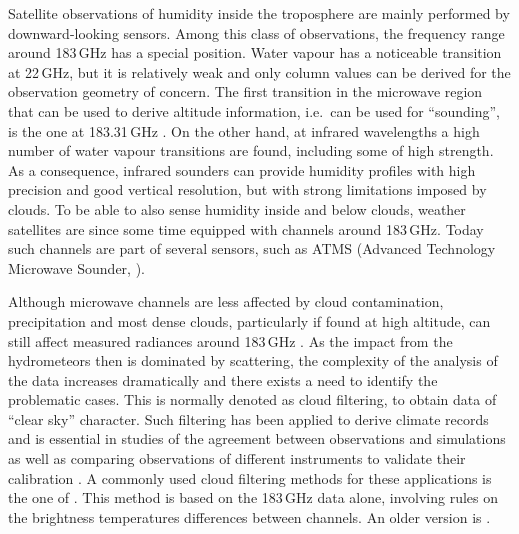 \documentclass[amt, manuscript]{copernicus}
\begin{document}
\introduction
%
Satellite observations of humidity inside the troposphere are mainly performed
by downward-looking sensors. Among this class of observations, the frequency
range around 183\,GHz has a special position. Water vapour has a noticeable
transition at 22\,GHz, but it is relatively weak and only column values can be
derived \citep[e.g.][]{schluessel1990atmospheric} for the observation geometry
of concern. The first transition in the microwave region that can be used to
derive altitude information, i.e.\ can be used for ``sounding'', is the one at
183.31\,GHz \citep{kakar1983retrieval,wang1983profiling}. On the other hand, at
infrared wavelengths a high number of water vapour transitions are found,
including some of high strength. As a consequence, infrared sounders can
provide humidity profiles with high precision and good vertical resolution, but
with strong limitations imposed by clouds. To be able to also sense humidity
inside and below clouds, weather satellites are since some time equipped with
channels around 183\,GHz. Today such channels are part of several sensors, such
as ATMS (Advanced Technology Microwave Sounder, \citet{weng2012introduction}).

Although microwave channels are less affected by cloud contamination, precipitation and most dense clouds, particularly if found at high altitude, can
still affect measured radiances around 183\,GHz
\citep[e.g.][]{bennartz2003sensitivity}. As the impact from the hydrometeors
then is dominated by scattering, the complexity of the analysis of the data
increases dramatically and there exists a need to identify the problematic
cases. This is normally denoted as cloud filtering, to obtain data of ``clear
sky'' character. Such filtering has been applied to derive climate records
\citep{lang2020new} and is essential in studies of the agreement between
observations and simulations \citep{brogniez2016review} as well as 
comparing observations of different instruments to validate their calibration
\citep{john2013assessment,moradi:retri:15,berg2016intercalibration}. A commonly
used cloud filtering methods for these applications is the one of
\citet{buehler:aclou:07}. This method is based on the 183\,GHz data alone,
involving rules on the brightness temperatures differences between channels. An
older version is \citet{burns1997effects}. 
\end{document}
